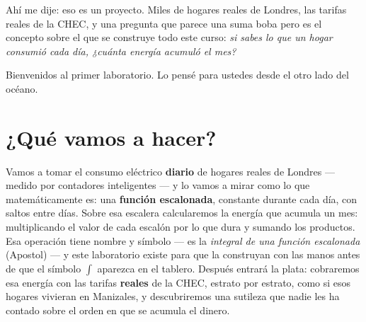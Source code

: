 \documentclass[12pt,letterpaper]{article}
\begin{document}
\begin{cajabitacora}
Ahí me dije: eso es un proyecto. Miles de hogares reales de Londres, las tarifas reales de la CHEC, y una pregunta que parece una suma boba pero es el concepto sobre el que se construye todo este curso: \emph{si sabes lo que un hogar consumió cada día, ¿cuánta energía acumuló el mes?}

Bienvenidos al primer laboratorio. Lo pensé para ustedes desde el otro lado del océano.
\end{cajabitacora}

\section{¿Qué vamos a hacer?}
Vamos a tomar el consumo eléctrico \textbf{diario} de hogares reales de Londres --- medido por contadores inteligentes --- y lo vamos a mirar como lo que matemáticamente es: una \textbf{función escalonada}, constante durante cada día, con saltos entre días. Sobre esa escalera calcularemos la energía que acumula un mes: multiplicando el valor de cada escalón por lo que dura y sumando los productos. Esa operación tiene nombre y símbolo --- es la \emph{integral de una función escalonada} (Apostol) --- y este laboratorio existe para que la construyan con las manos antes de que el símbolo $\int$ aparezca en el tablero. Después entrará la plata: cobraremos esa energía con las tarifas \textbf{reales} de la CHEC, estrato por estrato, como si esos hogares vivieran en Manizales, y descubriremos una sutileza que nadie les ha contado sobre el orden en que se acumula el dinero.
\end{document}
